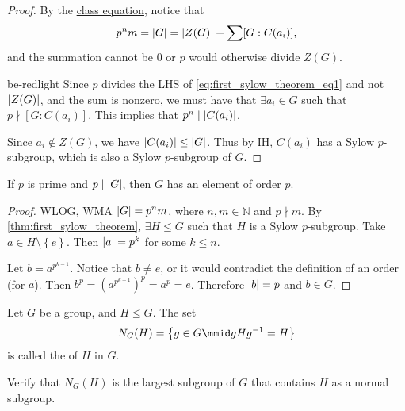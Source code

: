 \documentclass[notoc,notitlepage]{tufte-book}
\begin{document}
\begin{proof}
  \noindent
  By the \hyperref[crly:class_equation]{class equation},
  notice that
  \begin{equation}\label{eq:first_sylow_theorem_eq1}
    p^n m = \left|G\right| = \left|Z(G)\right| + \sum [ G : C(a_i) ],
  \end{equation}
  and the summation cannot be $0$ or $p$ would otherwise
  divide $Z(G)$.
  \begin{quotebox}{be-red}{light}
  Since $p$ divides the LHS of \cref{eq:first_sylow_theorem_eq1}
  and not $\left|Z(G)\right|$, and the sum is nonzero, we must 
  have that $\exists a_i \in G$ such that $p \nmid [ G : C(a_i) ]$.
  This implies that $p^n \mid \left| C(a_i) \right|$.
  \end{quotebox}
  Since $a_i \notin Z(G)$, we have $\left|C(a_i)\right| \leq \left|G\right|$.
  Thus by IH, $C(a_i)$ has a Sylow $p$-subgroup, which is also a
  Sylow $p$-subgroup of $G$.
\end{proof}

\begin{crly}\label{crly:cauchy_s_theorem}
  If $p$ is prime and $p \mid \left|G\right|$, then $G$ has an element of order $p$.
\end{crly}

\begin{proof}
  WLOG, WMA $\left|G\right| = p^n m$, where $n, m \in \mathbb{N}$ and
  $p \nmid m$. By \cref{thm:first_sylow_theorem}, $\exists H \leq G$
  such that $H$ is a Sylow $p$-subgroup.
  Take $a \in H \setminus \left\{ e \right\}$. Then $\left|a\right| = p^k$
  for some $k \leq n$.

  Let $b = a^{p^{k - 1}}$. Notice that $b \neq e$, or it would
  contradict the definition of an order (for $a$).
  Then $b^p = \left( a^{p^{k - 1}} \right)^p = a^p = e$.
  Therefore $\left|b\right| = p$ and $b \in G$.
\end{proof}

\begin{defn}[Normalizer]\label{defn:normalizer}
  Let $G$ be a group, and $H \leq G$. The set
  \begin{equation*}
    N_G(H) = \left\{ g \in G \mmid gHg^{-1} = H \right\}
  \end{equation*}
  is called the  of $H$ in $G$.
\end{defn}

\begin{ex}
  Verify that $N_G(H)$ is the largest subgroup of $G$
  that contains $H$ as a normal subgroup.
\end{ex}
\end{document}
